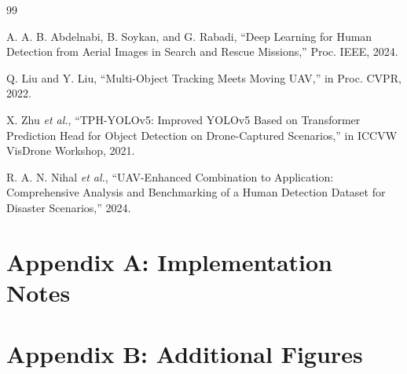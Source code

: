 \documentclass[12pt,a4paper]{report}
\begin{document}
\begin{thebibliography}{99}

A. A. B. Abdelnabi, B. Soykan, and G. Rabadi, ``Deep Learning for Human Detection from Aerial Images in Search and Rescue Missions,'' Proc. IEEE, 2024.

Q. Liu and Y. Liu, ``Multi-Object Tracking Meets Moving UAV,'' in Proc. CVPR, 2022.

X. Zhu \textit{et al.}, ``TPH-YOLOv5: Improved YOLOv5 Based on Transformer Prediction Head for Object Detection on Drone-Captured Scenarios,'' in ICCVW VisDrone Workshop, 2021.

R. A. N. Nihal \textit{et al.}, ``UAV-Enhanced Combination to Application: Comprehensive Analysis and Benchmarking of a Human Detection Dataset for Disaster Scenarios,'' 2024.


\end{thebibliography}

\appendix
\chapter{Appendix A: Implementation Notes}

\chapter{Appendix B: Additional Figures}
\end{document}
